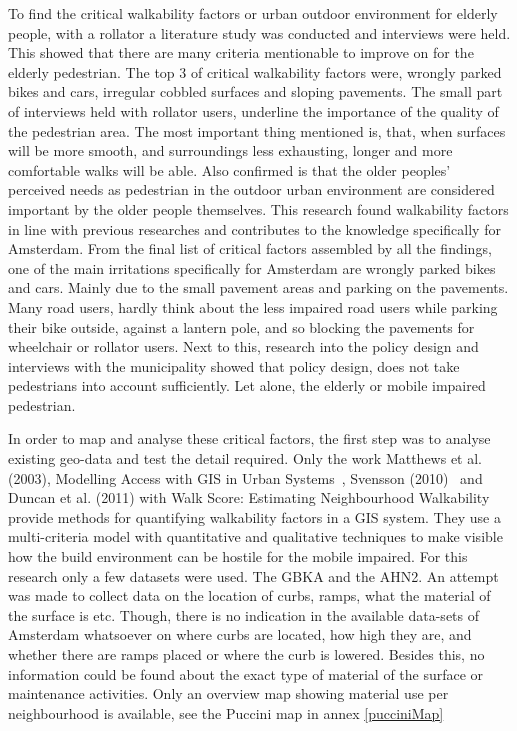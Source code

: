 To find the critical walkability factors or urban outdoor environment for elderly people, with a rollator a literature study was conducted and interviews were held. This showed that there are many criteria mentionable to improve on for the elderly pedestrian. The top 3 of critical walkability factors were, wrongly parked bikes and cars, irregular cobbled surfaces and sloping pavements. The small part of interviews held with rollator users, underline the importance of the quality of the pedestrian area. The most important thing mentioned is, that, when surfaces will be more smooth, and surroundings less exhausting, longer and more comfortable walks will be able. Also confirmed is that the older peoples' perceived needs as pedestrian in the outdoor urban environment are considered important by the older people themselves. This research found walkability factors in line with previous researches and contributes to the knowledge specifically for Amsterdam. From the final list of critical factors assembled by all the findings, one of the main irritations specifically for Amsterdam are wrongly parked bikes and cars. Mainly due to the small pavement areas and parking on the pavements. Many road users, hardly think about the less impaired road users while parking their bike outside, against a lantern pole, and so blocking the pavements for wheelchair or rollator users. Next to this, research into the policy design and interviews with the municipality showed that policy design, does not take pedestrians into account sufficiently. Let alone, the elderly or mobile impaired pedestrian. 


In order to map and analyse these critical factors, the first step was to analyse existing geo-data and test the detail required. Only the work Matthews et al. (2003), Modelling Access with GIS in Urban Systems~\cite{Matthews2003}, Svensson (2010)~\cite{Svensson2010} and Duncan et al. (2011) with Walk Score: Estimating Neighbourhood Walkability~\cite{Duncan2011} provide methods for quantifying walkability factors in a GIS system. They use a multi-criteria model with quantitative and qualitative techniques to make visible how the build environment can be hostile for the mobile impaired. 
For this research only a few datasets were used. The GBKA and the AHN2. An attempt was made to collect data on the location of curbs, ramps, what the material of the surface is etc. Though, there is no indication in the available data-sets of Amsterdam whatsoever on where curbs are located, how high they are, and whether there are ramps placed or where the curb is lowered. Besides this, no information could be found about the exact type of material of the surface or maintenance activities. Only an overview map showing material use per neighbourhood is available, see the Puccini map in annex \ref{pucciniMap} 

